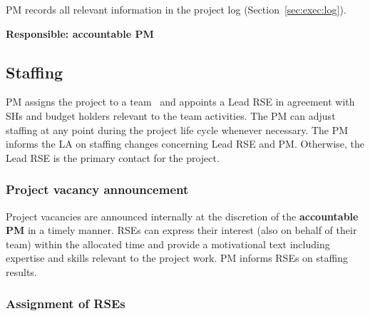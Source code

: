 PM records all relevant information in the project log (Section~\ref{sec:exec:log}).

\textbf{Responsible: accountable PM}

\subsection{Staffing}
\label{sec:init:vacancy}
PM assigns the project to a team~\cite{rse-teams} and appoints a Lead RSE in agreement with SHs and budget
holders relevant to the team activities. The PM can adjust staffing at any point during the project life cycle
whenever necessary. The PM informs the LA on staffing changes concerning Lead RSE and PM. 
Otherwise, the Lead RSE is the primary contact for the project.


\subsubsection{Project vacancy announcement}

Project vacancies are announced internally at the discretion of the \textbf{accountable PM} in a timely manner.
RSEs can express their interest (also on behalf of their team) within the allocated time and provide a motivational text including
expertise and skills relevant to the project work. PM informs RSEs on staffing results.

\subsubsection{Assignment of RSEs}
%

